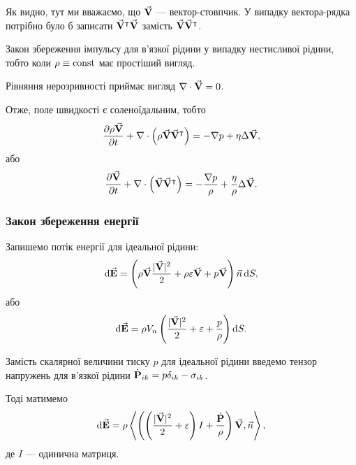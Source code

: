 \begin{remark}
	Як видно, тут ми вважаємо, що $\vecf V$ --- вектор-стовпчик. У випадку вектора-рядка потрібно було б записати $\vecf V^\intercal \vecf V$ замість $\vecf V \vecf V^\intercal$.
\end{remark}

\begin{remark}
	Закон збереження імпульсу для в'язкої рідини у випадку нестисливої рідини, тобто коли $\rho \equiv \const$ має простіший вигляд.
\end{remark}
	
Рівняння нерозривності приймає вигляд $\nabla \cdot \vecf V = 0$. \medskip

Отже, поле швидкості є соленоїдальним, тобто
\begin{equation}
	\frac{\partial \rho \vecf V}{\partial t} + \nabla \cdot \Big(\rho \vecf V \vecf V^\intercal\Big) = - \nabla p + \eta \Delta \vecf V,
\end{equation}
або
\begin{equation}
	\frac{\partial \vecf V}{\partial t} + \nabla \cdot \Big(\vecf V \vecf V^\intercal\Big) = - \frac{\nabla p}{\rho} + \frac{\eta}{\rho} \Delta \vecf V.
\end{equation}

\subsubsection{Закон збереження енергії}

Запишемо потік енергії для ідеальної рідини:
\begin{equation}
	\diff \vecf E = \left( \rho \vecf V \frac{|\vecf V|^2}{2} + \rho \epsilon \vecf V + p \vecf V\right) \vec n \diff S,
\end{equation}
або
\begin{equation}
	\diff \vecf E = \rho V_n \left( \frac{|\vecf V|^2}{2} + \epsilon + \frac{p}{\rho}\right)\diff S.
\end{equation}

Замість скалярної величини тиску $p$ для ідеальної рідини введемо тензор напружень для в'язкої рідини $\dot{\bf{P}}_{ik} = p \delta_{ik} - \sigma_{ik}$. \medskip

Тоді матимемо 
\begin{equation}
	\diff \vecf E = \rho \left\langle\left(\left( \frac{|\vecf V|^2}{2} + \epsilon \right) I + \frac{\dot{\bf{P}}}{\rho} \right)\vecf V, \vec n \right\rangle,
\end{equation}
де $I$ --- одинична матриця. \medskip

